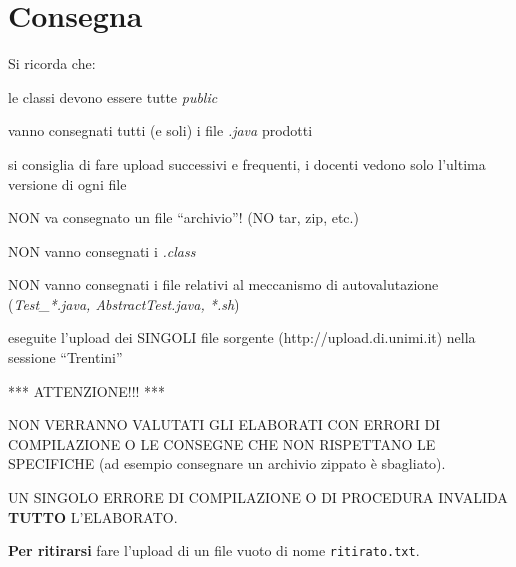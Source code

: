 \documentclass[12pt]{article}
\begin{document}
\hrulefill

\section*{Consegna}
Si ricorda che:
\begin{compactitem}
 \item le classi devono essere tutte \textit{public}
 \item vanno consegnati tutti (e soli) i file \textit{.java} prodotti
 \item si consiglia di fare upload successivi e frequenti, i docenti vedono solo l'ultima versione di ogni file
 \item NON va consegnato un file ``archivio''! (NO tar, zip, etc.)
 \item NON vanno consegnati i \textit{.class}
 \item NON vanno consegnati i file relativi al meccanismo di autovalutazione (\textit{Test\_*.java, AbstractTest.java, *.sh})
 \item eseguite l'upload dei SINGOLI file sorgente (http://upload.di.unimi.it) nella sessione ``Trentini''
\end{compactitem}

\hrulefill

\begin{center}*** ATTENZIONE!!! ***\end{center}

NON VERRANNO VALUTATI GLI ELABORATI CON ERRORI DI COMPILAZIONE O 
LE CONSEGNE CHE NON RISPETTANO LE SPECIFICHE (ad esempio consegnare un 
archivio zippato è sbagliato).%

UN SINGOLO ERRORE DI COMPILAZIONE O DI PROCEDURA INVALIDA 
\textbf{TUTTO} 
L'ELABORATO.
\medskip

\hrulefill

{\bf Per ritirarsi}
fare l'upload di un file vuoto di nome  \texttt{ritirato.txt}.

\hrulefill

\end{document}
